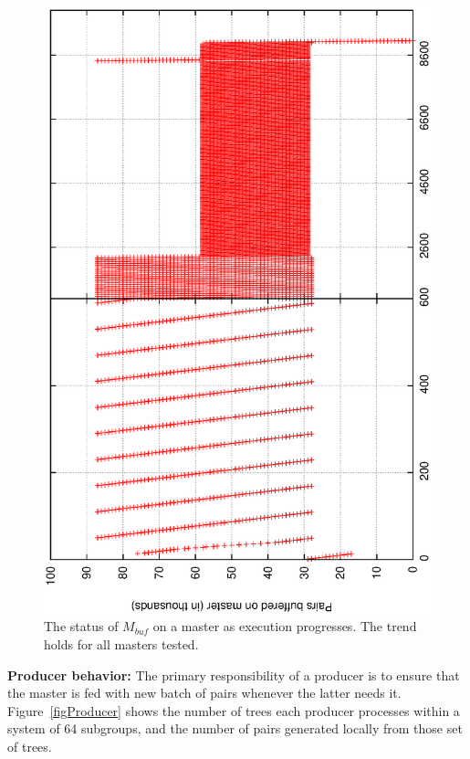 \documentclass[10pt,journal,letterpaper,compsoc]{IEEEtran}
\begin{document}
\begin{figure}[thb]
\centerline{
						\includegraphics[angle=-90, scale=0.33]{Group.pBuf.eps}
            }
\caption{
The status of $M_{buf}$ on a master as execution progresses. The trend holds for all masters tested.
}
\label{figMBuffer}
\end{figure}

{\bf Producer behavior:} The primary responsibility of a producer is to ensure that the master is fed with new batch of pairs whenever the latter needs it.  Figure~\ref{figProducer} shows the number of trees each producer processes within a system of 64 subgroups, and the number of pairs generated locally from those set of trees.
\end{document}
